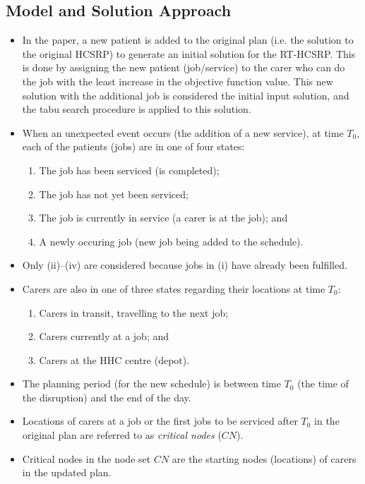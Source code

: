 \documentclass[a4paper]{article}
\begin{document}
\subsection{Model and Solution Approach}
\begin{itemize}[label=\textcolor{myPurple}{\textbullet},leftmargin=*,itemsep=-0.1em]
	\item In the paper, a new patient is added to the original plan (i.e. the solution to the original HCSRP) to generate an initial solution for the RT-HCSRP. This is done by assigning the new patient (job/service) to the carer who can do the job with the least increase in the objective function value. This new solution with the additional job is considered the initial input solution, and the tabu search procedure is applied to this solution.
	\item When an unexpected event occurs (the addition of a new service), at time $T_0$, each of the patients (jobs) are in one of four states: 
	\begin{enumerate}[label=(\roman*),itemsep=-0.1em]
		\item The job has been serviced (is completed); 
		\item The job has not yet been serviced; 
		\item The job is currently in service (a carer is at the job); and
		\item A newly occuring job (new job being added to the schedule).
	\end{enumerate}
	\item Only (ii)--(iv) are considered because jobs in (i) have already been fulfilled.
	\item Carers are also in one of three states regarding their locations at time $T_0$:
	\begin{enumerate}[label=(\roman*),itemsep=-0.1em]
		\item Carers in transit, travelling to the next job;
		\item Carers currently at a job; and
		\item Carers at the HHC centre (depot).
	\end{enumerate}
	\item The planning period (for the new schedule) is between time $T_0$ (the time of the disruption) and the end of the day.
	\item Locations of carers at a job or the first jobs to be serviced after $T_0$ in the original plan are referred to as \emph{critical nodes} ($CN$).
	\item Critical nodes in the node set $CN$ are the starting nodes (locations) of carers in the updated plan.

\end{itemize}
\end{document}
